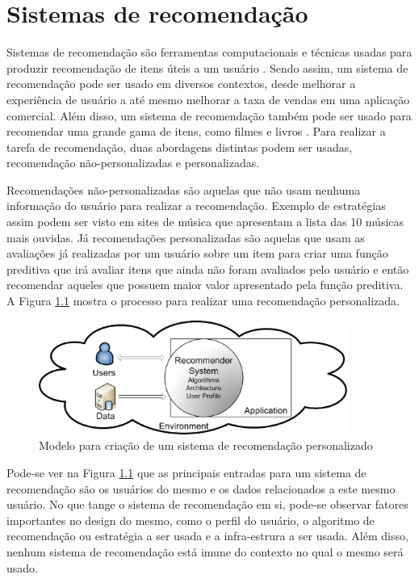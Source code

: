 \chapter[Sistemas de recomendação]{Sistemas de recomendação}

Sistemas de recomendação são ferramentas computacionais e técnicas usadas para
produzir recomendação de itens úteis a um usuário \cite{mahmood2009improving}.
Sendo assim, um sistema de recomendação pode ser usado em diversos contextos,
desde melhorar a experiência de usuário a até mesmo melhorar a taxa de vendas
em uma aplicação comercial. Além disso, um sistema de recomendação também pode
ser usado para recomendar uma grande gama de itens, como filmes e livros
\cite{ricci2011introduction}. Para realizar a tarefa de recomendação, duas abordagens distintas podem ser usadas,
recomendação não-personalizadas e personalizadas.

Recomendações não-personalizadas são aquelas que não usam nenhuma informação do
usuário para realizar a recomendação. Exemplo de estratégias assim podem ser
visto em sites de música que apresentam a lista das 10 músicas mais
ouvidas. Já recomendações personalizadas são aquelas que usam as avaliações já
realizadas por um usuário sobre um item para criar uma função preditiva que irá avaliar itens que ainda não foram
avaliados pelo usuário e então recomendar aqueles que possuem maior valor
apresentado pela função preditiva. A Figura \ref{fig:modelo_recomendacao} mostra
o processo para realizar uma recomendação personalizada.

\begin{figure}[h]
  \centering
  \includegraphics[width=0.9\textwidth]{figuras/recommender_model.eps}
  \caption{Modelo para criação de um sistema de recomendação personalizado \cite{picault2011get}}
  \label{fig:modelo_recomendacao}
\end{figure}

Pode-se ver na Figura \ref{fig:modelo_recomendacao} que as principais entradas
para um sistema de recomendação são os usuários do mesmo e os dados relacionados
a este mesmo usuário. No que tange o sistema de recomendação em si, pode-se
observar fatores importantes no design do mesmo, como o perfil do usuário, o
algoritmo de recomendação ou estratégia a ser usada e a infra-estrura a ser
usada. Além disso, nenhum sistema de recomendação está imune do contexto no qual
o mesmo será usado.


